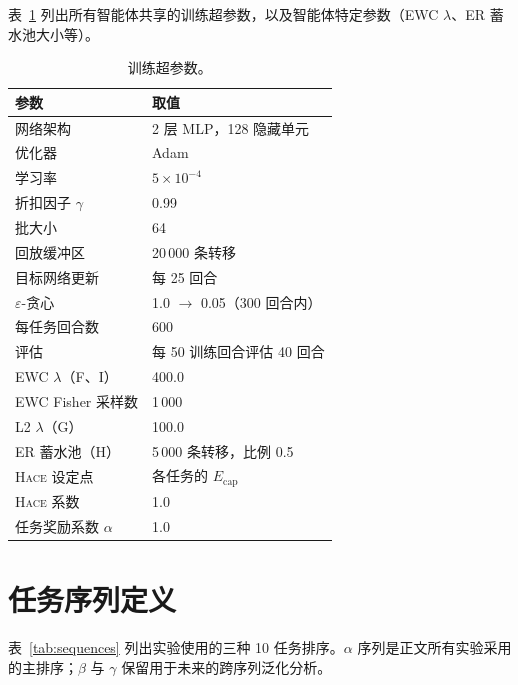 \documentclass[zihao=5,a4paper,linespread=1.3,fontset=fandol]{ctexart}
\newcommand{\energy}{E}
\newcommand{\hace}{\textsc{Hace}}
\begin{document}
表~\ref{tab:hyperparams} 列出所有智能体共享的训练超参数，以及智能体特定参数（EWC $\lambda$、ER 蓄水池大小等）。

\begin{table}[h]
\centering
\caption{训练超参数。}
\begin{tabular}{@{}ll@{}}
\toprule
\textbf{参数} & \textbf{取值} \\
\midrule
网络架构 & 2 层 MLP，128 隐藏单元 \\
优化器 & Adam \\
学习率 & $5 \times 10^{-4}$ \\
折扣因子 $\gamma$ & 0.99 \\
批大小 & 64 \\
回放缓冲区 & 20\,000 条转移 \\
目标网络更新 & 每 25 回合 \\
$\varepsilon$-贪心 & 1.0 $\to$ 0.05（300 回合内） \\
每任务回合数 & 600 \\
评估 & 每 50 训练回合评估 40 回合 \\
\midrule
EWC $\lambda$（F、I） & 400.0 \\
EWC Fisher 采样数 & 1\,000 \\
L2 $\lambda$（G） & 100.0 \\
ER 蓄水池（H） & 5\,000 条转移，比例 0.5 \\
\hace{} 设定点 & 各任务的 $\energy_{\text{cap}}$ \\
\hace{} 系数 & 1.0 \\
任务奖励系数 $\alpha$ & 1.0 \\
\bottomrule
\end{tabular}
\label{tab:hyperparams}
\end{table}

\section{任务序列定义}
\label{app:sequences}

表~\ref{tab:sequences} 列出实验使用的三种 10 任务排序。$\alpha$ 序列是正文所有实验采用的主排序；$\beta$ 与 $\gamma$ 保留用于未来的跨序列泛化分析。
\end{document}
